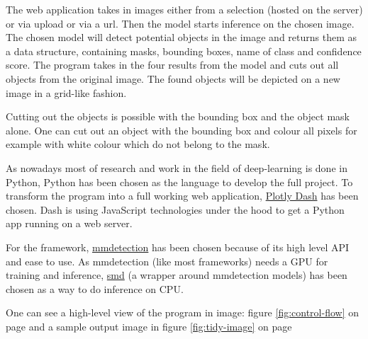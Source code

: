 \documentclass[a4paper,10pt,hidelinks]{scrartcl}
\newcommand{\imgref}[1]{{figure \ref{#1} on page \pageref{#1}}}
\begin{document}
The web application takes in images either from a selection (hosted on the server) or via upload or via a url. Then the model starts inference on the chosen image. The chosen model will detect potential objects in the image and returns them as a data structure, containing masks, bounding boxes, name of class and confidence score. \newline The program takes in the four results from the model and cuts out all objects from the original image. The found objects will be depicted on a new image in a grid-like fashion.

Cutting out the objects is possible with the bounding box and the object mask alone. One can cut out an object with the bounding box and colour all pixels for example with white colour which do not belong to the mask.

As nowadays most of research and work in the field of deep-learning is done in Python, Python has been chosen as the language to develop the full project. To transform the program into a full working web application, \href{https://dash.plotly.com}{Plotly Dash} has been chosen. Dash is using JavaScript technologies under the hood to get a Python app running on a web server.

For the framework, \href{https://github.com/open-mmlab/mmdetection/}{mmdetection} has been chosen because of its high level API and ease to use. As mmdetection (like most frameworks) needs a GPU for training and inference, \href{https://github.com/akarazniewicz/smd}{smd} (a wrapper around mmdetection models) has been chosen as a way to do inference on CPU.


One can see a high-level view of the program in image: \imgref{fig:control-flow} and a sample output image in \imgref{fig:tidy-image}
\end{document}

